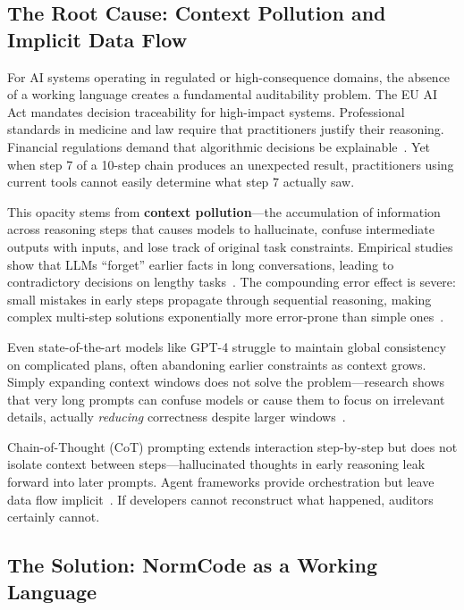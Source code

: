 \subsection{The Root Cause: Context Pollution and Implicit Data Flow}

For AI systems operating in regulated or high-consequence domains, the absence of a working language creates a fundamental auditability problem. The EU AI Act mandates decision traceability for high-impact systems. Professional standards in medicine and law require that practitioners justify their reasoning. Financial regulations demand that algorithmic decisions be explainable~\cite{sai2025}. Yet when step 7 of a 10-step chain produces an unexpected result, practitioners using current tools cannot easily determine what step 7 actually saw.

This opacity stems from \textbf{context pollution}---the accumulation of information across reasoning steps that causes models to hallucinate, confuse intermediate outputs with inputs, and lose track of original task constraints. Empirical studies show that LLMs ``forget'' earlier facts in long conversations, leading to contradictory decisions on lengthy tasks~\cite{chang2025, saga2025}. The compounding error effect is severe: small mistakes in early steps propagate through sequential reasoning, making complex multi-step solutions exponentially more error-prone than simple ones~\cite{wand2025}.

Even state-of-the-art models like GPT-4 struggle to maintain global consistency on complicated plans, often abandoning earlier constraints as context grows. Simply expanding context windows does not solve the problem---research shows that very long prompts can confuse models or cause them to focus on irrelevant details, actually \textit{reducing} correctness despite larger windows~\cite{breunig2025}.

Chain-of-Thought (CoT) prompting extends interaction step-by-step but does not isolate context between steps---hallucinated thoughts in early reasoning leak forward into later prompts. Agent frameworks provide orchestration but leave data flow implicit~\cite{ibm2025, wang2024}. If developers cannot reconstruct what happened, auditors certainly cannot.

\subsection{The Solution: NormCode as a Working Language}

